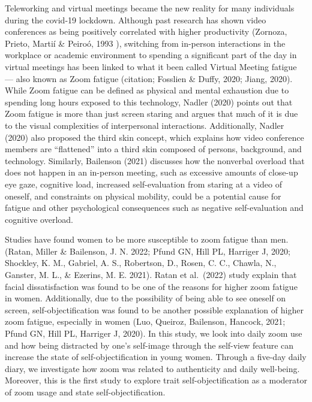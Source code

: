 \documentclass[
  english,
  man]{apa7}
\begin{document}
Teleworking and virtual meetings became the new reality for many individuals during the covid-19 lockdown. Although past research has shown video conferences as being positively correlated with higher productivity (Zornoza, Prieto, Martií \& Peiroó, 1993 ), switching from in-person interactions in the workplace or academic environment to spending a significant part of the day in virtual meetings has been linked to what it been called Virtual Meeting fatigue --- also known as Zoom fatigue (citation; Fosslien \& Duffy, 2020; Jiang, 2020). While Zoom fatigue can be defined as physical and mental exhaustion due to spending long hours exposed to this technology, Nadler (2020) points out that Zoom fatigue is more than just screen staring and argues that much of it is due to the visual complexities of interpersonal interactions. Additionally, Nadler (2020) also proposed the third skin concept, which explains how video conference members are ``flattened'' into a third skin composed of persons, background, and technology. Similarly, Bailenson (2021) discusses how the nonverbal overload that does not happen in an in-person meeting, such as excessive amounts of close-up eye gaze, cognitive load, increased self-evaluation from staring at a video of oneself, and constraints on physical mobility, could be a potential cause for fatigue and other psychological consequences such as negative self-evaluation and cognitive overload.

Studies have found women to be more susceptible to zoom fatigue than men. (Ratan, Miller \& Bailenson, J. N. 2022; Pfund GN, Hill PL, Harriger J, 2020; Shockley, K. M., Gabriel, A. S., Robertson, D., Rosen, C. C., Chawla, N., Ganster, M. L., \& Ezerins, M. E. 2021). Ratan et al.~(2022) study explain that facial dissatisfaction was found to be one of the reasons for higher zoom fatigue in women. Additionally, due to the possibility of being able to see oneself on screen, self-objectification was found to be another possible explanation of higher zoom fatigue, especially in women (Luo, Queiroz, Bailenson, Hancock, 2021; Pfund GN, Hill PL, Harriger J, 2020). In this study, we look into daily zoom use and how being distracted by one's self-image through the self-view feature can increase the state of self-objectification in young women. Through a five-day daily diary, we investigate how zoom was related to authenticity and daily well-being. Moreover, this is the first study to explore trait self-objectification as a moderator of zoom usage and state self-objectification.
\end{document}
